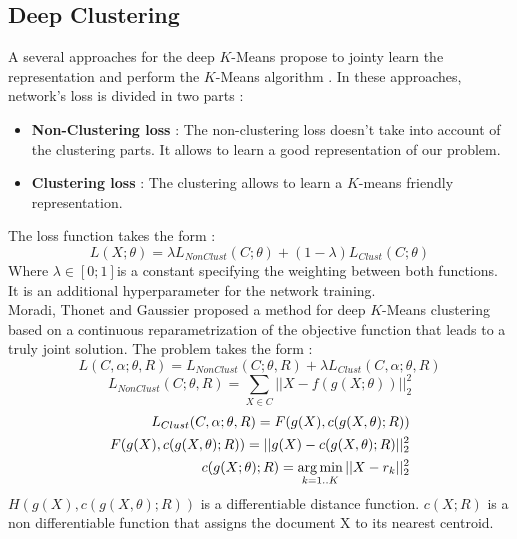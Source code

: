 \subsection{Deep Clustering}\label{seq:DeepClust}
A several approaches for the deep $K$-Means propose to jointy learn the
representation and perform the $K$-Means algorithm \cite{2018arXiv180107648A}.
In these approaches, network's loss is divided in two parts :
\begin{itemize}
\item \textbf{Non-Clustering loss} : The non-clustering loss doesn't
  take into account of the clustering parts. It allows to learn a good
  representation of our problem.
\item \textbf{Clustering loss} : The clustering allows to learn a
  $K$-means friendly representation.
\end{itemize}
The loss function takes the form :
\begin{equation}
L(X;\theta) = \lambda L_{NonClust}(C;\theta) + (1-\lambda)L_{Clust}(C; \theta)
\end{equation}
Where $\lambda \in [0 ; 1]$is a constant specifying the weighting between both 
functions.
It is an additional hyperparameter for the network training.\\
Moradi, Thonet and Gaussier \cite{Deap-K-Means} proposed a method for deep $K$-Means 
clustering based on a continuous reparametrization of the objective function 
that leads to a truly joint solution. 
The problem takes the form : 
\begin{equation}
L(C ,\alpha;\theta,R) = L_{NonClust}(C;\theta,R ) + \lambda L_{Clust}(C,\alpha;\theta,R)
\end{equation}
\begin{equation}
L_{NonClust}(C;\theta,R ) = \sum_{X \in C} ||X - f(g(X;\theta))||_2^2
\end{equation}
\begin{equation}
\begin{aligned}
  L_{Clust}(C,\alpha;\theta,R) = F(g(X),c(g(X, \theta); R))\\
  F(g(X),c(g(X, \theta); R)) = ||g(X) - c(g(X, \theta); R) ||_2^2\\
  c(g(X; \theta); R) = \operatorname*{arg\,min}_{k = 1 .. K} || X - r_k||_2^2
\end{aligned}
\end{equation}
$H(g(X),c(g(X, \theta); R))$ is a differentiable distance function.
$c(X ; R)$ is a non differentiable function that assigns the document X
to its nearest centroid.\\
